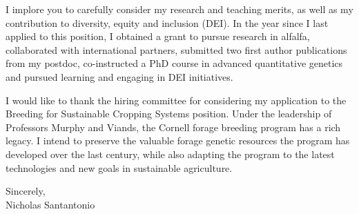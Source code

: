 \documentclass[11pt, letterpaper]{moderncv}
\begin{document}
I implore you to carefully consider my research and teaching merits, as well as my contribution to diversity, equity and inclusion (DEI). In the year since I last applied to this position, I obtained a grant to pursue research in alfalfa, collaborated with international partners, submitted two first author publications from my postdoc, co-instructed a PhD course in advanced quantitative genetics and pursued learning and engaging in DEI initiatives. 

I would like to thank the hiring committee for considering my application to the Breeding for Sustainable Cropping Systems position. Under the leadership of Professors Murphy and Viands, the Cornell forage breeding program has a rich legacy. I intend to preserve the valuable forage genetic resources the program has developed over the last century, while also adapting the program to the latest technologies and new goals in sustainable agriculture.

\bigskip

Sincerely,\\
\vspace{2cm}
Nicholas Santantonio
\end{document}
